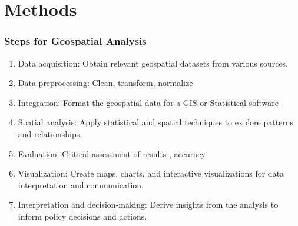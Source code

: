 \documentclass[xcolor=x11names,aspectratio=169, compress]{beamer}
\renewcommand{\(}{\begin{columns}}
\renewcommand{\)}{\end{columns}}
\newcommand{\<}[1]{\begin{column}{#1}}
\renewcommand{\>}{\end{column}}
\begin{document}
\section{Methods}

\begin{frame}
    \frametitle{Steps for Geospatial Analysis}
    \begin{enumerate}[<+->]
        \item Data acquisition: Obtain relevant geospatial datasets from various sources.
        \item Data preprocessing: Clean, transform, normalize
        \item Integration: Format the geospatial data for a GIS or Statistical software
        \item Spatial analysis: Apply statistical and spatial techniques to explore patterns and relationships.
        \item Evaluation:  Critical assessment of results , accuracy
        \item Visualization: Create maps, charts, and interactive visualizations for data interpretation and communication.
        \item Interpretation and decision-making: Derive insights from the analysis to inform policy decisions and actions.
    \end{enumerate}
\end{frame}
\end{document}

